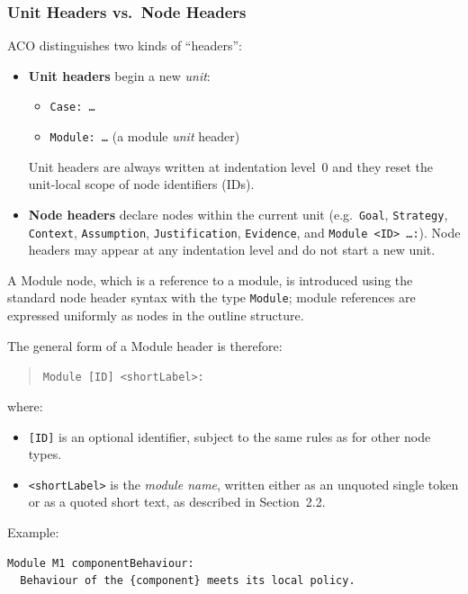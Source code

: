 \documentclass[11pt]{article}
\begin{document}
\subsubsection*{Unit Headers vs.\ Node Headers}
ACO distinguishes two kinds of ``headers'':

\begin{itemize}[leftmargin=2em]
  \item \textbf{Unit headers} begin a new \emph{unit}:
  \begin{itemize}[leftmargin=1.5em]
    \item \texttt{Case: \dots}
    \item \texttt{Module: \dots} (a module \emph{unit} header)
  \end{itemize}
  Unit headers are always written at indentation level~0 and they reset the unit-local scope of node identifiers (IDs).
  \item \textbf{Node headers} declare nodes within the current unit (e.g.\ \texttt{Goal}, \texttt{Strategy}, \texttt{Context}, \texttt{Assumption}, \texttt{Justification}, \texttt{Evidence}, and \texttt{Module <ID> \dots :}).
  Node headers may appear at any indentation level and do not start a new unit.
\end{itemize}



A Module node, which is a reference to a module, is introduced using the standard node header syntax with the type
\texttt{Module};
module references are expressed uniformly as nodes in the outline structure.

The general form of a Module header is therefore:
\begin{quote}
\texttt{Module [ID] \textless shortLabel\textgreater:}
\end{quote}

where:
\begin{itemize}[leftmargin=2em]
  \item \texttt{[ID]} is an optional identifier, subject to the same rules as for other node types.
  \item \texttt{\textless shortLabel\textgreater{}} is the \emph{module name}, written either as an
        unquoted single token or as a quoted short text, as described in Section~2.2.
\end{itemize}

Example:
\begin{verbatim}
Module M1 componentBehaviour:
  Behaviour of the {component} meets its local policy.
\end{verbatim}
\end{document}
